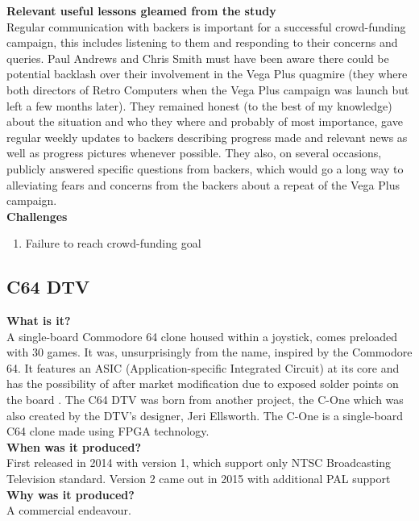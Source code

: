 \textbf{Relevant useful lessons gleamed from the study}\\
Regular communication with backers is important for a successful crowd-funding campaign, this includes listening to them and responding to their concerns and queries. Paul Andrews and Chris Smith must have been aware there could be potential backlash over their involvement in the Vega Plus quagmire (they where both directors of Retro Computers when the Vega Plus campaign was launch but left a few months later). They remained honest (to the best of my knowledge) about the situation and who they where and probably of most importance, gave regular weekly updates to backers describing progress made and relevant news as well as progress pictures whenever possible. They also, on several occasions, publicly answered specific questions from backers, which would go a long way to alleviating fears and concerns from the backers about a repeat of the Vega Plus campaign.  \\

\textbf{Challenges}
\begin{enumerate}
\item Failure to reach crowd-funding goal
\end{enumerate}


\subsection{C64 DTV}
\textbf{What is it?}\\
A single-board Commodore 64 clone housed within a joystick, comes preloaded with 30 games. It was, unsurprisingly from the name, inspired by the Commodore 64. It features an ASIC (Application-specific Integrated Circuit) at its core 
\cite{RN129} and has the possibility of after market modification due to exposed solder points on the board
\cite{RN126}. The C64 DTV was born from another project, the C-One which was also created by the DTV's designer, Jeri Ellsworth. The C-One is a single-board C64 clone made using FPGA technology.\\

\textbf{When was it produced?}\\
First released in 2014 with version 1, which support only NTSC Broadcasting Television standard. Version 2 came out in 2015 with additional PAL support\\

\textbf{Why was it produced?}\\
A commercial endeavour. \\

